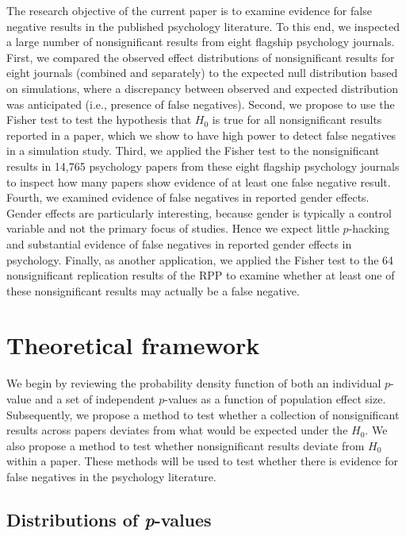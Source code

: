 \documentclass{article}
\begin{document}
The research objective of the current paper is to examine evidence for false negative results in the published psychology literature. To this end, we inspected a large number of nonsignificant results from eight flagship psychology journals. First, we compared the observed effect distributions of nonsignificant results for eight journals (combined and separately) to the expected null distribution based on simulations, where a discrepancy between observed and expected distribution was anticipated (i.e., presence of false negatives). Second, we propose to use the Fisher test to test the hypothesis that $H_0$ is true for all nonsignificant results reported in a paper, which we show to have high power to detect false negatives in a simulation study. Third, we applied the Fisher test to the nonsignificant results in 14,765 psychology papers from these eight flagship psychology journals to inspect how many papers show evidence of at least one false negative result. Fourth, we examined evidence of false negatives in reported gender effects. Gender effects are particularly interesting, because gender is typically a control variable and not the primary focus of studies. Hence we expect little $p$-hacking and substantial evidence of false negatives in reported gender effects in psychology. Finally, as another application, we applied the Fisher test to the 64 nonsignificant replication results of the RPP \cite{Open_Science_Collaboration2015-zs} to examine whether at least one of these nonsignificant results may actually be a false negative. 

\section*{Theoretical framework}

We begin by reviewing the probability density function of both an individual $p$-value and a set of independent $p$-values as a function of population effect size. Subsequently, we propose  a method to test whether a collection of nonsignificant results across papers deviates from what would be expected under the $H_0$. We also propose a method to test whether nonsignificant results deviate from $H_0$ within a paper. These methods will be used to test whether there is evidence for false negatives in the psychology literature.

\subsection*{Distributions of \textit{p}-values}
\end{document}
